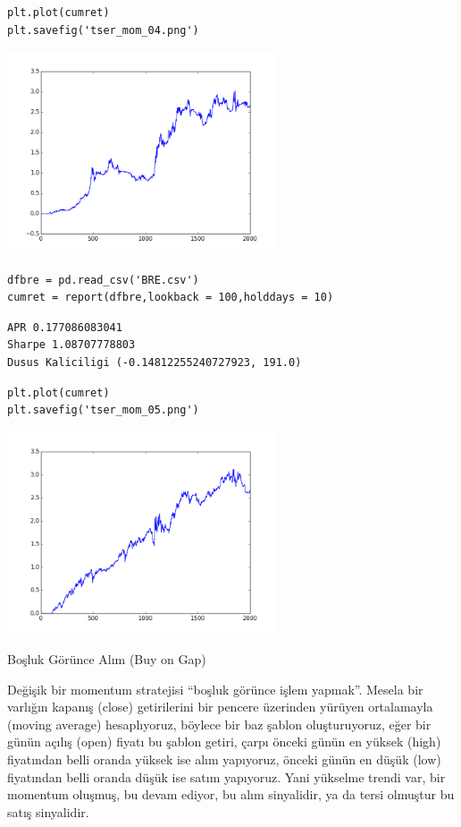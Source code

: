 \documentclass[12pt,fleqn]{article}\usepackage{../../common}
\begin{document}
\begin{verbatim}
plt.plot(cumret)
plt.savefig('tser_mom_04.png')
\end{verbatim}

\includegraphics[height=6cm]{tser_mom_04.png}

\begin{verbatim}
dfbre = pd.read_csv('BRE.csv')
cumret = report(dfbre,lookback = 100,holddays = 10)
\end{verbatim}

\begin{verbatim}
APR 0.177086083041
Sharpe 1.08707778803
Dusus Kaliciligi (-0.14812255240727923, 191.0)
\end{verbatim}

\begin{verbatim}
plt.plot(cumret)
plt.savefig('tser_mom_05.png')
\end{verbatim}

\includegraphics[height=6cm]{tser_mom_05.png}

Boşluk Görünce Alım (Buy on Gap)

Değişik bir momentum stratejisi ``boşluk görünce işlem yapmak''. Mesela bir
varlığın kapanış (close) getirilerini bir pencere üzerinden yürüyen
ortalamayla (moving average) hesaplıyoruz, böylece bir baz şablon
oluşturuyoruz, eğer bir günün açılış (open) fiyatı bu şablon getiri, çarpı
önceki günün en yüksek (high) fiyatından belli oranda yüksek ise alım
yapıyoruz, önceki günün en düşük (low) fiyatından belli oranda düşük ise
satım yapıyoruz. Yani yükselme trendi var, bir momentum oluşmuş, bu devam
ediyor, bu alım sinyalidir, ya da tersi olmuştur bu satış sinyalidir.
\end{document}
